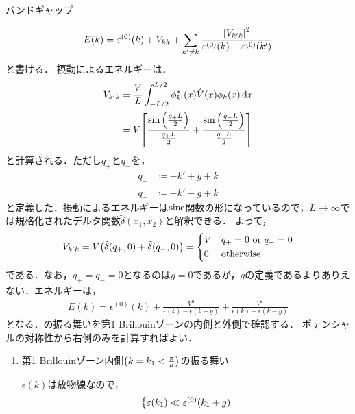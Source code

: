 \documentclass{report}
\begin{document}
\begin{myex}{バンドギャップ}{}
\begin{enumerate}
        \begin{align}
          E(k) = \varepsilon^{(0)}(k) + V_{kk} + \sum_{k'\neq k}\frac{\abs{V_{k'k}}^2}{\varepsilon^{(0)}(k) - \varepsilon^{(0)}(k')}
        \end{align}
        と書ける．
        摂動によるエネルギーは．
        \begin{align}
          V_{k'k} &= \frac{V}{L}\int_{-L/2}^{L/2}\phi_{k'}^{*}(x)\hat{V}(x)\phi_k(x)\dd{x} \\
          &= V\qty[\frac{\sin\qty(\frac{q_+L}{2})}{\frac{q_+L}{2}} + \frac{\sin\qty(\frac{q_-L}{2})}{\frac{q_-L}{2}}] 
        \end{align}
        と計算される．ただし$q_+$と$q_-$を，
        \begin{align}
          q_+ &\coloneqq -k' + g + k \\ 
          q_- &\coloneqq -k' - g + k
        \end{align}
        と定義した．摂動によるエネルギーは$\mathrm{sinc}$関数の形になっているので，$L\to\infty$では規格化されたデルタ関数$\tilde{\delta}(x_1, x_2)$と解釈できる．
        よって，
        \begin{align}
          V_{k'k} = V\qty(\tilde{\delta}(q_+, 0) + \tilde{\delta}(q_-, 0)) = 
          \begin{dcases}
            V & q_+ = 0\ \mathrm{or}\ q_- = 0\\
            0 & \mathrm{otherwise}
          \end{dcases}
        \end{align}
        である．なお，$q_+ = q_- = 0$となるのは$g = 0$であるが，$g$の定義であるよりありえない．エネルギーは，
        \begin{align}
          E(k) = \epsilon^{(0)}(k) + \frac{V^2}{\epsilon(k) - \epsilon(k + g)} + \frac{V^2}{\epsilon(k) - \epsilon(k - g)}\label{2nd-order-perturbation-eigenvalue-in-electron}
        \end{align}
        となる．の振る舞いを第1 Brillouinゾーンの内側と外側で確認する．
        ポテンシャルの対称性から右側のみを計算すればよい．
        \begin{enumerate}
          \item 第1 Brillouinゾーン内側$\qty(k = k_1 < \frac{\pi}{a})$の振る舞い\par
          $\epsilon(k)$は放物線なので，
          \begin{align}
            \begin{dcases}
              \epsilon(k_1) \ll \epsilon^{(0)}(k_1 + g) \\

\end{dcases}
\end{align}
\end{enumerate}
\end{enumerate}
\end{myex}
\end{document}

